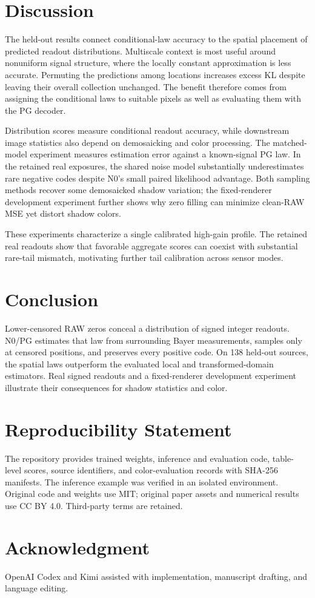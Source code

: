 \documentclass[10pt,twocolumn,journal]{IEEEtran}
\begin{document}
\section{Discussion}
The held-out results connect conditional-law accuracy to the spatial placement of predicted readout distributions. Multiscale context is most useful around nonuniform signal structure, where the locally constant approximation is less accurate. Permuting the predictions among locations increases excess KL despite leaving their overall collection unchanged. The benefit therefore comes from assigning the conditional laws to suitable pixels as well as evaluating them with the PG decoder.

Distribution scores measure conditional readout accuracy, while downstream image statistics also depend on demosaicking and color processing. The matched-model experiment measures estimation error against a known-signal PG law. In the retained real exposures, the shared noise model substantially underestimates rare negative codes despite N0's small paired likelihood advantage. Both sampling methods recover some demosaicked shadow variation; the fixed-renderer development experiment further shows why zero filling can minimize clean-RAW MSE yet distort shadow colors.

These experiments characterize a single calibrated high-gain profile. The retained real readouts show that favorable aggregate scores can coexist with substantial rare-tail mismatch, motivating further tail calibration across sensor modes.

\section{Conclusion}
Lower-censored RAW zeros conceal a distribution of signed integer readouts. N0/PG estimates that law from surrounding Bayer measurements, samples only at censored positions, and preserves every positive code. On 138 held-out sources, the spatial laws outperform the evaluated local and transformed-domain estimators. Real signed readouts and a fixed-renderer development experiment illustrate their consequences for shadow statistics and color.

\section*{Reproducibility Statement}
The repository provides trained weights, inference and evaluation code, table-level scores, source identifiers, and color-evaluation records with SHA-256 manifests. The inference example was verified in an isolated environment. Original code and weights use MIT; original paper assets and numerical results use CC BY 4.0. Third-party terms are retained.

\section*{Acknowledgment}
OpenAI Codex and Kimi assisted with implementation, manuscript drafting, and language editing.



\end{document}
